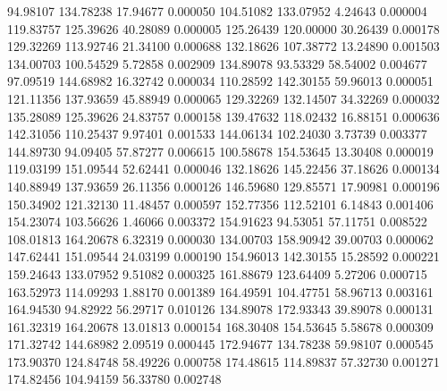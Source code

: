        94.98107      134.78238       17.94677       0.000050
      104.51082      133.07952        4.24643       0.000004
      119.83757      125.39626       40.28089       0.000005
      125.26439      120.00000       30.26439       0.000178
      129.32269      113.92746       21.34100       0.000688
      132.18626      107.38772       13.24890       0.001503
      134.00703      100.54529        5.72858       0.002909
      134.89078       93.53329       58.54002       0.004677
       97.09519      144.68982       16.32742       0.000034
      110.28592      142.30155       59.96013       0.000051
      121.11356      137.93659       45.88949       0.000065
      129.32269      132.14507       34.32269       0.000032
      135.28089      125.39626       24.83757       0.000158
      139.47632      118.02432       16.88151       0.000636
      142.31056      110.25437        9.97401       0.001533
      144.06134      102.24030        3.73739       0.003377
      144.89730       94.09405       57.87277       0.006615
      100.58678      154.53645       13.30408       0.000019
      119.03199      151.09544       52.62441       0.000046
      132.18626      145.22456       37.18626       0.000134
      140.88949      137.93659       26.11356       0.000126
      146.59680      129.85571       17.90981       0.000196
      150.34902      121.32130       11.48457       0.000597
      152.77356      112.52101        6.14843       0.001406
      154.23074      103.56626        1.46066       0.003372
      154.91623       94.53051       57.11751       0.008522
      108.01813      164.20678        6.32319       0.000030
      134.00703      158.90942       39.00703       0.000062
      147.62441      151.09544       24.03199       0.000190
      154.96013      142.30155       15.28592       0.000221
      159.24643      133.07952        9.51082       0.000325
      161.88679      123.64409        5.27206       0.000715
      163.52973      114.09293        1.88170       0.001389
      164.49591      104.47751       58.96713       0.003161
      164.94530       94.82922       56.29717       0.010126
      134.89078      172.93343       39.89078       0.000131
      161.32319      164.20678       13.01813       0.000154
      168.30408      154.53645        5.58678       0.000309
      171.32742      144.68982        2.09519       0.000445
      172.94677      134.78238       59.98107       0.000545
      173.90370      124.84748       58.49226       0.000758
      174.48615      114.89837       57.32730       0.001271
      174.82456      104.94159       56.33780       0.002748
